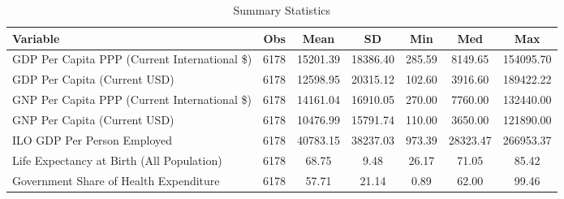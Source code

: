 \begin{table}
\centering
\caption{Summary Statistics}
\label{Sum_Stats}
\begin{tabular}{lcccccc}
\toprule
                                    Variable &  Obs &     Mean &       SD &    Min &      Med &       Max \\
\midrule
GDP Per Capita PPP (Current International \$) & 6178 & 15201.39 & 18386.40 & 285.59 & 8149.65 & 154095.70 \\
GDP Per Capita (Current USD) & 6178 & 12598.95 & 20315.12 & 102.60 & 3916.60 & 189422.22 \\
GNP Per Capita PPP (Current International \$) & 6178 & 14161.04 & 16910.05 & 270.00 & 7760.00 & 132440.00 \\
GNP Per Capita (Current USD) & 6178 & 10476.99 & 15791.74 & 110.00 & 3650.00 & 121890.00 \\
ILO GDP Per Person Employed & 6178 & 40783.15 & 38237.03 & 973.39 & 28323.47 & 266953.37 \\
Life Expectancy at Birth (All Population) & 6178 & 68.75 & 9.48 & 26.17 & 71.05 & 85.42 \\
Government Share of Health Expenditure & 6178 & 57.71 & 21.14 & 0.89 & 62.00 & 99.46 \\
\bottomrule
\end{tabular}
\end{table}
